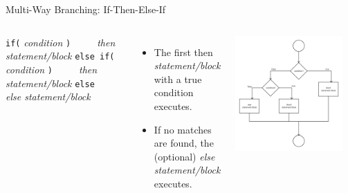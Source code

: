 \documentclass[]{beamer}
\begin{document}
\begin{frame}[fragile]{Multi-Way Branching: If-Then-Else-If}
\begin{columns}
    \verb!if(! \textit{condition} \verb!)! 
    \newline\verb!    ! \textit{then statement/block}
    \verb!else if(! \textit{condition} \verb!)! 
    \newline\verb!    ! \textit{then statement/block}
    \newline\verb!else!
    \newline\verb!    ! \textit{else statement/block}
    
    \vspace{0.5cm}

    \begin{itemize}[<+(1)->]
        \item The first then \textit{statement/block} with a true condition executes.
        \item If no matches are found, the (optional) \textit{else statement/block} executes.
    \end{itemize}

    \includegraphics[width=0.9\textwidth]{images/if-elseif}
\end{columns}
\end{frame}
\end{document}
